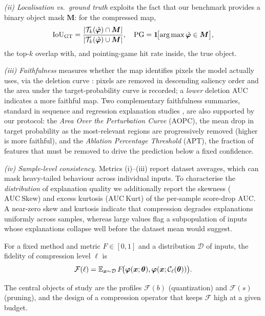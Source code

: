 \emph{(ii) Localisation vs.\ ground truth} exploits the fact that our benchmark
provides a binary object mask $\bm M$: for the compressed map,
\begin{equation}
\mathrm{IoU}_{\mathrm{GT}}=\frac{|\mathcal T_k(\tilde{\bm{\varphi}})\cap\bm M|}
{|\mathcal T_k(\tilde{\bm{\varphi}})\cup\bm M|},\quad
\mathrm{PG}=\bm 1\!\bigl[\operatorname*{arg\,max}\tilde{\bm{\varphi}}\in\bm M\bigr],
\end{equation}
the top-$k$ overlap with, and pointing-game hit rate inside, the true object.

\emph{(iii) Faithfulness} measures whether the map identifies pixels the model
actually uses, via the deletion curve \cite{petsiuk2018rise}: pixels are removed
in descending saliency order and the area under the target-probability curve is
recorded; a \emph{lower} deletion AUC indicates a more faithful map. Two
complementary faithfulness summaries, standard in sequence and regression
explanation studies \cite{samek2017evaluating}, are also supported by our
protocol: the \emph{Area Over the Perturbation Curve} (AOPC), the mean drop in
target probability as the most-relevant regions are progressively removed
(higher is more faithful), and the \emph{Ablation Percentage Threshold} (APT),
the fraction of features that must be removed to drive the prediction below a
fixed confidence.

\emph{(iv) Sample-level consistency.} Metrics (i)--(iii) report dataset averages,
which can mask heavy-tailed behaviour across individual inputs. To characterise
the \emph{distribution} of explanation quality we additionally report the
skewness ($\mathrm{AUC\ Skew}$) and excess kurtosis ($\mathrm{AUC\ Kurt}$) of the
per-sample score-drop AUC. A near-zero skew and kurtosis indicate that
compression degrades explanations uniformly across samples, whereas large values
flag a subpopulation of inputs whose explanations collapse well before the
dataset mean would suggest.

\begin{definition}
For a fixed method and metric $F\!\in\![0,1]$ and a distribution $\mathcal D$
of inputs, the fidelity of compression level $\ell$ is
\begin{equation}
\mathcal F(\ell)=\mathbb{E}_{\bm{x}\sim\mathcal D}\,F\!\bigl(\bm{\varphi}(\bm{x};\bm{\theta}),
\bm{\varphi}(\bm{x};\mathcal{C}_\ell(\bm{\theta}))\bigr).
\end{equation}
\end{definition}

The central objects of study are the profiles $\mathcal F(b)$ (quantization)
and $\mathcal F(s)$ (pruning), and the design of a compression operator that
keeps $\mathcal F$ high at a given budget.
